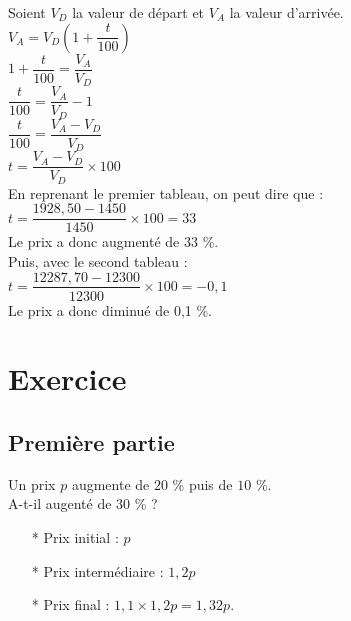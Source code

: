 Soient $V_D$ la valeur de départ et $V_A$ la valeur d'arrivée. \\

$V_A = V_D \left(1 + \dfrac{t}{100} \right) $ \\

$ 1 + \dfrac{t}{100} = \dfrac{V_A}{V_D} $ \\

$ \dfrac{t}{100} = \dfrac{V_A}{V_D} - 1 $ \\

$ \dfrac{t}{100} = \dfrac{V_A - V_D}{V_D} $ \\

$ t = \dfrac{V_A - V_D}{V_D} \times 100 $ \\

En reprenant le premier tableau, on peut dire que : \\

$ t = \dfrac{1928,50 - 1450}{1450} \times 100 = 33 $ \\

Le prix a donc augmenté de 33 \%. \\

Puis, avec le second tableau :  \\

$ t = \dfrac{12287,70 - 12300}{12300} \times 100 = -0,1 $ \\

Le prix a donc diminué de 0,1 \%.

\newpage

\section{Exercice }

\subsection*{Première partie}

Un prix $p$ augmente de $20$ \% puis de $10$ \%. \\

A-t-il augenté de $30$ \% ? \\

\begin{enumerate}
\item[*] Prix initial : $p$
\item[*] Prix intermédiaire : $1,2p$
\item[*] Prix final : $1,1 \times 1,2p = 1,32 p $. 
\end{enumerate} 

